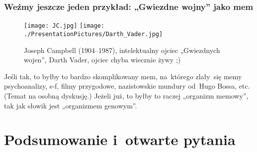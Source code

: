 \documentclass[10pt,t]{beamer}
\begin{document}
\begin{frame}
  \frametitle{Weźmy jeszcze jeden przykład: „Gwiezdne wojny” jako mem}


  \begin{figure}

    \centering

    \texttt{[image: JC.jpg]}
    \texttt{[image: ./PresentationPictures/Darth\_Vader.jpg]}


    \caption{Joseph Campbell (1904--1987), intelektualny ojciec
      „Gwiezdnych wojen”,
      Darth Vader, ojciec chyba wiecznie żywy ;)}

  \end{figure}



  Jeśli tak, to byłby to bardzo skomplikowany mem, na~którego
  zlały~się memy psychoanalizy, s-f, filmy przygodowe,
  nazistowskie mundury od~Hugo Bossa, etc. (Temat na osobną dyskusję.)
  Jeżeli już, to byłby to raczej „organizm memowy”, tak jak słowik jest
  „organizmem genowym”.

\end{frame}










\section{Podsumowanie i~otwarte pytania}
\end{document}
